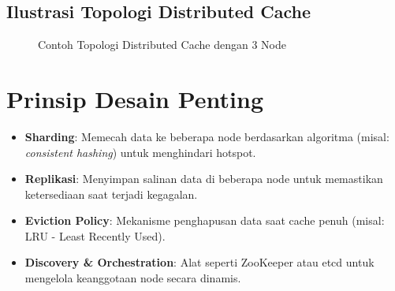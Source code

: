 \documentclass[11pt, a4paper]{book}
\begin{document}
	\subsection*{Ilustrasi Topologi Distributed Cache}
	\label{subsec:topologi}
	
	\begin{figure}[H]
		\centering
		\caption{Contoh Topologi Distributed Cache dengan 3 Node}
		\label{fig:topologi}
	\end{figure}
	
	\section{Prinsip Desain Penting}
	\label{sec:prinsip-desain}
	
	\begin{itemize}
		\item \textbf{Sharding}:  
		Memecah data ke beberapa node berdasarkan algoritma (misal: \textit{consistent hashing}) untuk menghindari hotspot.
		
		\item \textbf{Replikasi}:  
		Menyimpan salinan data di beberapa node untuk memastikan ketersediaan saat terjadi kegagalan.
		
		\item \textbf{Eviction Policy}:  
		Mekanisme penghapusan data saat cache penuh (misal: LRU - Least Recently Used).
		
		\item \textbf{Discovery \& Orchestration}:  
		Alat seperti ZooKeeper atau etcd untuk mengelola keanggotaan node secara dinamis.
	\end{itemize}
	
\end{document}
